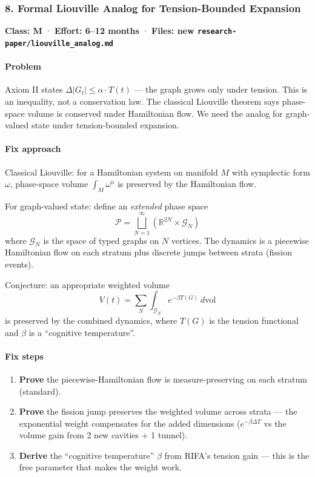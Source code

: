\documentclass[
  11pt,
  a4paper,
]{article}
\providecommand{\tightlist}{%
  \setlength{\itemsep}{0pt}\setlength{\parskip}{0pt}}
\begin{document}
\subsubsection{8. Formal Liouville Analog for Tension-Bounded
Expansion}\label{formal-liouville-analog-for-tension-bounded-expansion-1}

\textbf{Class: M} · \textbf{Effort: 6--12 months} · \textbf{Files: new
\texttt{research-paper/liouville\_analog.md}}

\paragraph{Problem}\label{problem-7}

Axiom II states \(\Delta|G_t| \leq \alpha \cdot T(t)\) --- the graph
grows only under tension. This is an inequality, not a conservation law.
The classical Liouville theorem says phase-space volume is conserved
under Hamiltonian flow. We need the analog for graph-valued state under
tension-bounded expansion.

\paragraph{Fix approach}\label{fix-approach}

Classical Liouville: for a Hamiltonian system on manifold \(M\) with
symplectic form \(\omega\), phase-space volume \(\int_M \omega^n\) is
preserved by the Hamiltonian flow.

For graph-valued state: define an \emph{extended} phase space \[
\mathcal{P} = \bigsqcup_{N=1}^{\infty} \left(\mathbb{R}^{2N} \times \mathcal{G}_N\right)
\] where \(\mathcal{G}_N\) is the space of typed graphs on \(N\)
vertices. The dynamics is a piecewise Hamiltonian flow on each stratum
plus discrete jumps between strata (fission events).

Conjecture: an appropriate weighted volume \[
V(t) = \sum_N \int_{\mathcal{G}_N} e^{-\beta T(G)} \, d\text{vol}
\] is preserved by the combined dynamics, where \(T(G)\) is the tension
functional and \(\beta\) is a ``cognitive temperature''.

\paragraph{Fix steps}\label{fix-steps}

\begin{enumerate}
\def\labelenumi{\arabic{enumi}.}
\tightlist
\item
  \textbf{Prove} the piecewise-Hamiltonian flow is measure-preserving on
  each stratum (standard).
\item
  \textbf{Prove} the fission jump preserves the weighted volume across
  strata --- the exponential weight compensates for the added dimensions
  (\(e^{-\beta \Delta T}\) vs the volume gain from 2 new cavities + 1
  tunnel).
\item
  \textbf{Derive} the ``cognitive temperature'' \(\beta\) from RIFA's
  tension gain --- this is the free parameter that makes the weight
  work.
\end{enumerate}
\end{document}
